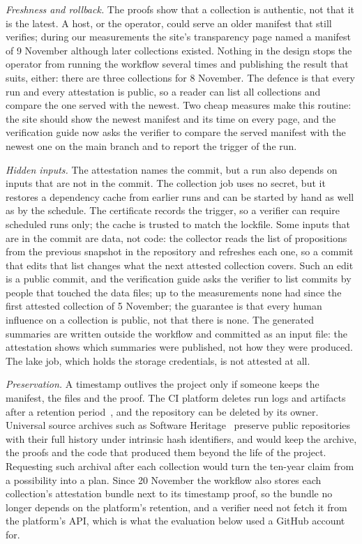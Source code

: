 \emph{Freshness and rollback.} The proofs show that a collection is authentic, not that it is the latest. A host, or the operator, could serve an older manifest that still verifies; during our measurements the site's transparency page named a manifest of 9 November although later collections existed. Nothing in the design stops the operator from running the workflow several times and publishing the result that suits, either: there are three collections for 8 November. The defence is that every run and every attestation is public, so a reader can list all collections and compare the one served with the newest. Two cheap measures make this routine: the site should show the newest manifest and its time on every page, and the verification guide now asks the verifier to compare the served manifest with the newest one on the main branch and to report the trigger of the run.

\emph{Hidden inputs.} The attestation names the commit, but a run also depends on inputs that are not in the commit. The collection job uses no secret, but it restores a dependency cache from earlier runs and can be started by hand as well as by the schedule. The certificate records the trigger, so a verifier can require scheduled runs only; the cache is trusted to match the lockfile. Some inputs that are in the commit are data, not code: the collector reads the list of propositions from the previous snapshot in the repository and refreshes each one, so a commit that edits that list changes what the next attested collection covers. Such an edit is a public commit, and the verification guide asks the verifier to list commits by people that touched the data files; up to the measurements none had since the first attested collection of 5 November; the guarantee is that every human influence on a collection is public, not that there is none. The generated summaries are written outside the workflow and committed as an input file: the attestation shows which summaries were published, not how they were produced. The lake job, which holds the storage credentials, is not attested at all.

\emph{Preservation.} A timestamp outlives the project only if someone keeps the manifest, the files and the proof. The CI platform deletes run logs and artifacts after a retention period~\citep{github-log-retention}, and the repository can be deleted by its owner. Universal source archives such as Software Heritage~\citep{dicosmo2017software} preserve public repositories with their full history under intrinsic hash identifiers, and would keep the archive, the proofs and the code that produced them beyond the life of the project. Requesting such archival after each collection would turn the ten-year claim from a possibility into a plan. Since 20 November the workflow also stores each collection's attestation bundle next to its timestamp proof, so the bundle no longer depends on the platform's retention, and a verifier need not fetch it from the platform's API, which is what the evaluation below used a GitHub account for.

